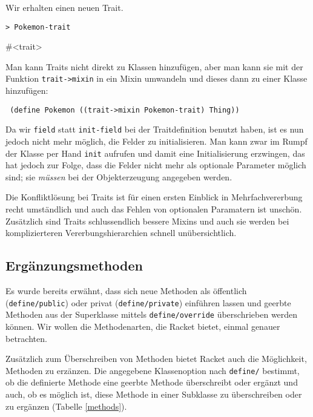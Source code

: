 Wir erhalten einen neuen Trait. 

\begin{lstlisting}
> Pokemon-trait
\end{lstlisting}
{\routput \#<trait>}

Man kann Traits nicht direkt zu Klassen hinzufügen, aber man kann sie mit der Funktion \texttt{trait->mixin} in ein Mixin umwandeln und dieses dann zu einer Klasse hinzufügen:

\begin{lstlisting}
 (define Pokemon ((trait->mixin Pokemon-trait) Thing))
\end{lstlisting}

Da wir \texttt{field} statt \texttt{init-field} bei der Traitdefinition benutzt haben, ist es nun jedoch nicht mehr möglich, die Felder zu initialisieren. Man kann zwar im Rumpf der Klasse per Hand \texttt{init} aufrufen und damit eine Initialisierung erzwingen, das hat jedoch zur Folge, dass die Felder nicht mehr als optionale Parameter möglich sind; sie \textit{müssen} bei der Objekterzeugung angegeben werden.

Die Konfliktlösung bei Traits ist für einen ersten Einblick in Mehrfachvererbung recht umständlich und auch das Fehlen von optionalen Paramatern ist unschön. Zusätzlich sind Traits schlussendlich bessere Mixins und auch sie werden bei komplizierteren Vererbungshierarchien schnell unübersichtlich.

\subsection{Ergänzungsmethoden}

Es wurde bereits erwähnt, dass sich neue Methoden als öffentlich (\texttt{define/public}) oder privat (\texttt{define/private}) einführen lassen und geerbte Methoden aus der Superklasse mittels \texttt{define/override} überschrieben werden können. Wir wollen die Methodenarten, die Racket bietet, einmal genauer betrachten. 

Zusätzlich zum Überschreiben von Methoden bietet Racket auch die Möglichkeit, Methoden zu erzänzen. Die angegebene Klassenoption nach \texttt{define/} bestimmt, ob die definierte Methode eine geerbte Methode überschreibt oder ergänzt und auch, ob es möglich ist, diese Methode in einer Subklasse zu überschreiben oder zu ergänzen (Tabelle \ref{methods}).

